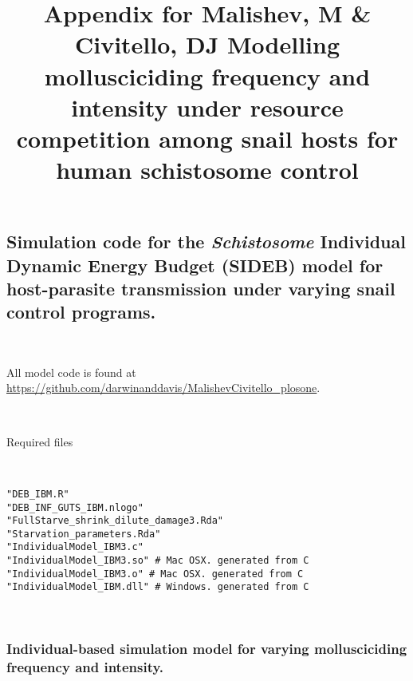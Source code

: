 \documentclass[10,portrait]{article}
\title{Appendix for Malishev, M \& Civitello, DJ Modelling mollusciciding
frequency and intensity under resource competition among snail hosts for
human schistosome control}
\date{}
\begin{document}
\maketitle

\subsection{\texorpdfstring{Simulation code for the \emph{Schistosome}
Individual Dynamic Energy Budget (SIDEB) model for host-parasite
transmission under varying snail control
programs.}{Simulation code for the Schistosome Individual Dynamic Energy Budget (SIDEB) model for host-parasite transmission under varying snail control programs.}}\label{simulation-code-for-the-schistosome-individual-dynamic-energy-budget-sideb-model-for-host-parasite-transmission-under-varying-snail-control-programs.}

~ ~

All model code is found at
\url{https://github.com/darwinanddavis/MalishevCivitello_plosone}.

~ ~

Required files

~ ~

\begin{verbatim}
"DEB_IBM.R"
"DEB_INF_GUTS_IBM.nlogo"
"FullStarve_shrink_dilute_damage3.Rda"
"Starvation_parameters.Rda"  
"IndividualModel_IBM3.c"
"IndividualModel_IBM3.so" # Mac OSX. generated from C
"IndividualModel_IBM3.o" # Mac OSX. generated from C  
"IndividualModel_IBM.dll" # Windows. generated from C  
\end{verbatim}

~ ~

\subsubsection{Individual-based simulation model for varying
mollusciciding frequency and
intensity.}\label{individual-based-simulation-model-for-varying-mollusciciding-frequency-and-intensity.}

~ ~
\end{document}

